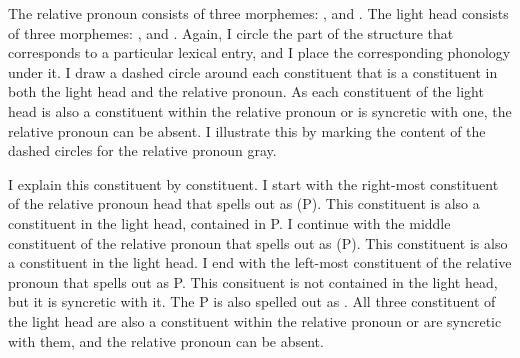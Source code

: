 The relative pronoun consists of three morphemes: ,  and .
The light head consists of three morphemes: ,  and .
Again, I circle the part of the structure that corresponds to a particular lexical entry, and I place the corresponding phonology under it.
I draw a dashed circle around each constituent that is a constituent in both the light head and the relative pronoun.
As each constituent of the light head is also a constituent within the relative pronoun or is syncretic with one, the relative pronoun can be absent. I illustrate this by marking the content of the dashed circles for the relative pronoun gray.

I explain this constituent by constituent.
I start with the right-most constituent of the relative pronoun head that spells out as  (P). This constituent is also a constituent in the light head, contained in P.
I continue with the middle constituent of the relative pronoun that spells out as  (P). This constituent is also a constituent in the light head.
I end with the left-most constituent of the relative pronoun that spells out as  {P}. This consituent is not contained in the light head, but it is syncretic with it. The P is also spelled out as .
All three constituent of the light head are also a constituent within the relative pronoun or are syncretic with them, and the relative pronoun can be absent.

